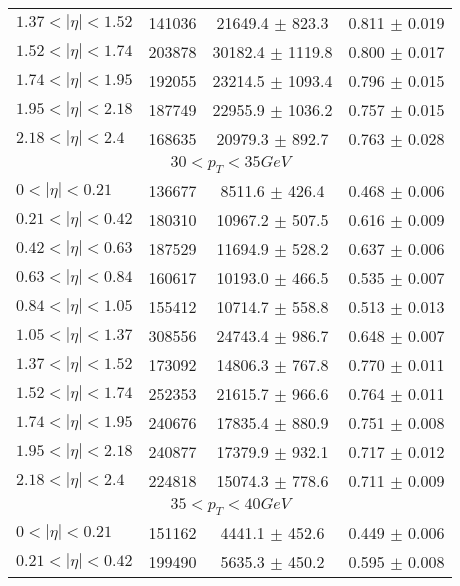 \begin{tabular}{lccc}
$1.37 < |\eta| <1.52$          & 141036     & 21649.4    $\pm$ 823.3 & 0.811      $\pm$ 0.019 \\
$1.52 < |\eta| <1.74$          & 203878     & 30182.4    $\pm$ 1119.8 & 0.800      $\pm$ 0.017 \\
$1.74 < |\eta| <1.95$          & 192055     & 23214.5    $\pm$ 1093.4 & 0.796      $\pm$ 0.015 \\
$1.95 < |\eta| <2.18$          & 187749     & 22955.9    $\pm$ 1036.2 & 0.757      $\pm$ 0.015 \\
$2.18 < |\eta| <2.4$           & 168635     & 20979.3    $\pm$ 892.7 & 0.763      $\pm$ 0.028 \\
\hline
\multicolumn{4}{c}{$30 < p_{T} < 35 GeV$} \\
\hline
$0 < |\eta| <0.21$             & 136677     & 8511.6     $\pm$ 426.4 & 0.468      $\pm$ 0.006 \\
$0.21 < |\eta| <0.42$          & 180310     & 10967.2    $\pm$ 507.5 & 0.616      $\pm$ 0.009 \\
$0.42 < |\eta| <0.63$          & 187529     & 11694.9    $\pm$ 528.2 & 0.637      $\pm$ 0.006 \\
$0.63 < |\eta| <0.84$          & 160617     & 10193.0    $\pm$ 466.5 & 0.535      $\pm$ 0.007 \\
$0.84 < |\eta| <1.05$          & 155412     & 10714.7    $\pm$ 558.8 & 0.513      $\pm$ 0.013 \\
$1.05 < |\eta| <1.37$          & 308556     & 24743.4    $\pm$ 986.7 & 0.648      $\pm$ 0.007 \\
$1.37 < |\eta| <1.52$          & 173092     & 14806.3    $\pm$ 767.8 & 0.770      $\pm$ 0.011 \\
$1.52 < |\eta| <1.74$          & 252353     & 21615.7    $\pm$ 966.6 & 0.764      $\pm$ 0.011 \\
$1.74 < |\eta| <1.95$          & 240676     & 17835.4    $\pm$ 880.9 & 0.751      $\pm$ 0.008 \\
$1.95 < |\eta| <2.18$          & 240877     & 17379.9    $\pm$ 932.1 & 0.717      $\pm$ 0.012 \\
$2.18 < |\eta| <2.4$           & 224818     & 15074.3    $\pm$ 778.6 & 0.711      $\pm$ 0.009 \\
\hline
\multicolumn{4}{c}{$35 < p_{T} < 40 GeV$} \\
\hline
$0 < |\eta| <0.21$             & 151162     & 4441.1     $\pm$ 452.6 & 0.449      $\pm$ 0.006 \\
$0.21 < |\eta| <0.42$          & 199490     & 5635.3     $\pm$ 450.2 & 0.595      $\pm$ 0.008 \\

\end{tabular}

